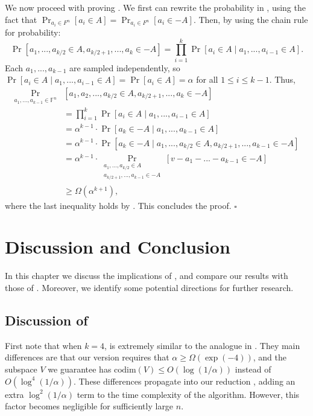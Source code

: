 \documentclass[12pt]{caltech_thesis}
\newcommand{\codim}{\text{codim}}
\begin{document}
We now proceed with proving .
We first can rewrite the probability in , using the fact that $\Pr_{a_i \in F^n}[a_i \in A] = \Pr_{a_i \in F^n}[a_i \in -A]$.
Then, by using the chain rule for probability:
\begin{equation*}
\label{eq:chain-rule}
    \Pr[a_1, ..., a_{k/2} \in A, a_{k/2 + 1}, ..., a_k \in -A] = \prod_{i=1}^{k} \Pr[a_i \in A \mid a_1, ..., a_{i-1} \in A].
\end{equation*}
Each $a_1, ..., a_{k-1}$ are sampled independently, so $\Pr[a_i \in A \mid a_1, ..., a_{i-1} \in A] = \Pr[a_i \in A] = \alpha$ for all $1 \leq i \leq k - 1$.
Thus,
\begin{align*}
    \Pr_{a_1, ..., a_{k-1} \in \mathbb{F}^n}&[a_1, a_2, ..., a_{k/2} \in A, a_{k/2 + 1}, ..., a_k \in -A] \\&= \prod_{i=1}^{k} \Pr[a_i \in A \mid a_1, ..., a_{i-1} \in A]
    \\&=\alpha^{k-1}\cdot\Pr[a_k \in -A \mid a_1, ...,  a_{k-1} \in A]\\
    &= \alpha^{k-1}\cdot \Pr[a_k \in -A \mid a_1, ..., a_{k/2} \in A, a_{k/2 + 1}, ..., a_{k-1} \in -A]\\
    &= \alpha^{k-1}\cdot \Pr_{\substack{a_1, ..., a_{k/2} \in A\\ a_{k/2 + 1},...,a_{k-1}\in -A}} \left[ v - a_1 - ... - a_{k-1} \in -A \right]\\
    &\geq \Omega(\alpha^{k+1}),
\end{align*}
where the last inequality holds by .
This concludes the proof.
\hfill$\square$

\chapter{Discussion and Conclusion}

In this chapter we discuss the implications of , and compare our results with those of \cite{asadi2022worstcase}. Moreover, we identify some potential directions for further research.

\section{Discussion of }
First note that when $k = 4$,  is extremely similar to the analogue in \cite{asadi2022worstcase}. They main differences are that our version requires that $\alpha \geq \Omega(\exp(-4))$, and the subspace $V$ we guarantee has $\codim(V) \leq O(\log(1/\alpha))$ instead of $O(\log^4(1/\alpha))$. These differences propagate into our reduction , adding an extra $\log^2(1/\alpha)$ term to the time complexity of the algorithm. However, this factor becomes negligible for sufficiently large $n$.
\end{document}
